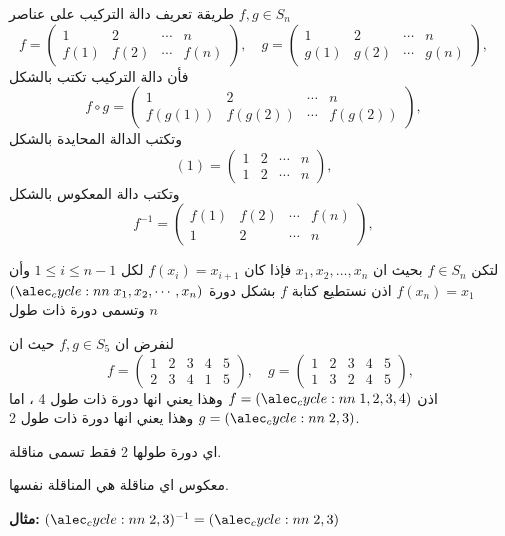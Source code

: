 \begin{note}
	طريقة تعريف دالة التركيب على عناصر $f, g\in S_n$ 
	\[
	f = \begin{pmatrix}
		1&2&\cdots&n\\
		f(1)&f(2)&\cdots&f(n)
	\end{pmatrix}, \quad 
	g = \begin{pmatrix}
	1&2&\cdots&n\\
	g(1)&g(2)&\cdots&g(n)
\end{pmatrix}, \quad 
	\]
	فأن دالة التركيب تكتب بالشكل
	\[
		f\circ g = \begin{pmatrix}
		1&2&\cdots&n\\
		f(g(1))&f(g(2))&\cdots&f(g(2))
	\end{pmatrix}, \quad 
	\]
	وتكتب الدالة المحايدة بالشكل
	\[
		(1)= \begin{pmatrix}
		1&2&\cdots&n\\
		1&2&\cdots&n
	\end{pmatrix}, \quad 
	\]
	وتكتب دالة المعكوس بالشكل
	\[
	f^{-1}=
		 \begin{pmatrix}
		f(1)&f(2)&\cdots&f(n)\\
				1&2&\cdots&n
	\end{pmatrix}, \quad 
	\]
\end{note}

\begin{definition}
	لتكن $f\in S_n$ بحيث ان $x_1, x_2, \dots, x_n$ فإذا كان $f(x_i) = x_{i+1}$ لكل $1\leq i\leq n-1$ وأن $f(x_n)=x_1$ اذن نستطيع كتابة $f$ بشكل دورة $\cycle{x_1, x_2, \cdots, x_n}$ وتسمى دورة ذات طول  $n$ 
\end{definition}

\begin{example}
	لنفرض ان $f, g\in S_5$ حيث ان
	\[
	f = \begin{pmatrix}
		1&2&3&4&5\\
		2&3&4&1&5
	\end{pmatrix}, \quad
		g = \begin{pmatrix}
		1&2&3&4&5\\
		1&3&2&4&5
	\end{pmatrix}, 
	\]
	اذن $f=\cycle{1,2,3,4}$ وهذا يعني انها دورة ذات طول 4 ، اما $g=\cycle{2,3}$ وهذا يعني انها دورة ذات طول 2.
\end{example}

\begin{definition}
	اي دورة طولها 2 فقط تسمى مناقلة.
\end{definition}

\begin{note}
معكوس اي مناقلة هي المناقلة نفسها.
\end{note}
\noindent
\textbf{مثال: }$\cycle{2,3}^{-1} = \cycle{2,3}$

